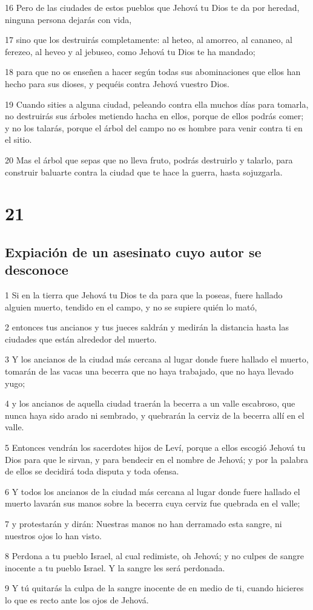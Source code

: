 \par 16 Pero de las ciudades de estos pueblos que Jehová tu Dios te da por heredad, ninguna persona dejarás con vida,
\par 17 sino que los destruirás completamente: al heteo, al amorreo, al cananeo, al ferezeo, al heveo y al jebuseo, como Jehová tu Dios te ha mandado;
\par 18 para que no os enseñen a hacer según todas sus abominaciones que ellos han hecho para sus dioses, y pequéis contra Jehová vuestro Dios.
\par 19 Cuando sities a alguna ciudad, peleando contra ella muchos días para tomarla, no destruirás sus árboles metiendo hacha en ellos, porque de ellos podrás comer; y no los talarás, porque el árbol del campo no es hombre para venir contra ti en el sitio.
\par 20 Mas el árbol que sepas que no lleva fruto, podrás destruirlo y talarlo, para construir baluarte contra la ciudad que te hace la guerra, hasta sojuzgarla.

\chapter{21}

\section{Expiación de un asesinato cuyo autor se desconoce}

\par 1 Si en la tierra que Jehová tu Dios te da para que la poseas, fuere hallado alguien muerto, tendido en el campo, y no se supiere quién lo mató,
\par 2 entonces tus ancianos y tus jueces saldrán y medirán la distancia hasta las ciudades que están alrededor del muerto.
\par 3 Y los ancianos de la ciudad más cercana al lugar donde fuere hallado el muerto, tomarán de las vacas una becerra que no haya trabajado, que no haya llevado yugo;
\par 4 y los ancianos de aquella ciudad traerán la becerra a un valle escabroso, que nunca haya sido arado ni sembrado, y quebrarán la cerviz de la becerra allí en el valle.
\par 5 Entonces vendrán los sacerdotes hijos de Leví, porque a ellos escogió Jehová tu Dios para que le sirvan, y para bendecir en el nombre de Jehová; y por la palabra de ellos se decidirá toda disputa y toda ofensa.
\par 6 Y todos los ancianos de la ciudad más cercana al lugar donde fuere hallado el muerto lavarán sus manos sobre la becerra cuya cerviz fue quebrada en el valle;
\par 7 y protestarán y dirán: Nuestras manos no han derramado esta sangre, ni nuestros ojos lo han visto.
\par 8 Perdona a tu pueblo Israel, al cual redimiste, oh Jehová; y no culpes de sangre inocente a tu pueblo Israel. Y la sangre les será perdonada.
\par 9 Y tú quitarás la culpa de la sangre inocente de en medio de ti, cuando hicieres lo que es recto ante los ojos de Jehová.

